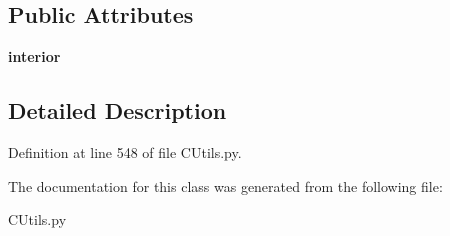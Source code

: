 \subsection*{Public Attributes}
\begin{DoxyCompactItemize}
\item 
\mbox{\label{class_c_utils_1_1_utils_1_1_u_i_1_1_controls_1_1_collapsible_frame_ae90f7328998ffbb9126e8c2db65049c5}} 
{\bfseries interior}
\end{DoxyCompactItemize}


\subsection{Detailed Description}


Definition at line 548 of file C\+Utils.\+py.



The documentation for this class was generated from the following file\+:\begin{DoxyCompactItemize}
\item 
C\+Utils.\+py\end{DoxyCompactItemize}
